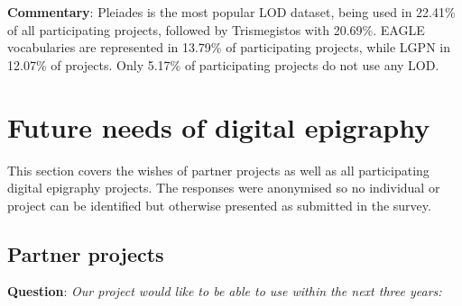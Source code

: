 \documentclass[
]{article}
\begin{document}
\textbf{Commentary}: Pleiades is the most popular LOD dataset, being
used in 22.41\% of all participating projects, followed by Trismegistos
with 20.69\%. EAGLE vocabularies are represented in 13.79\% of
participating projects, while LGPN in 12.07\% of projects. Only 5.17\%
of participating projects do not use any LOD.

\hypertarget{future-needs-of-digital-epigraphy}{%
\section{Future needs of digital
epigraphy}\label{future-needs-of-digital-epigraphy}}

This section covers the wishes of partner projects as well as all
participating digital epigraphy projects. The responses were anonymised
so no individual or project can be identified but otherwise presented as
submitted in the survey.

\hypertarget{partner-projects}{%
\subsection{Partner projects}\label{partner-projects}}

\textbf{Question}: \emph{Our project would like to be able to use within
the next three years:}
\end{document}

